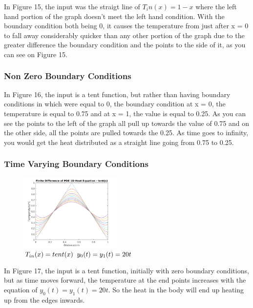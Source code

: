 \documentclass[11pt,a4paper]{article}
\begin{document}
In Figure 15, the input was the straigt line of $T_in(x) = 1-x$ where the left hand portion of the graph doesn't meet the left hand condition. With the boundary condition both being 0, it causes the temperature from just after x = 0 to fall away considerably quicker than any other portion of the graph due to the greater difference the boundary condition and the points to the side of it, as you can see on Figure 15.

\subsubsection{Non Zero Boundary Conditions}

In Figure 16, the input is a tent function, but rather than having boundary conditions in which were equal to 0, the boundary condition at x = 0, the temperature is equal to 0.75 and at x = 1, the value is equal to 0.25. As you can see the points to the left of the graph all pull up towards the value of 0.75 and on the other side, all the points are pulled towards the 0.25. As time goes to infinity, you would get the heat distributed as a straight line going from 0.75 to 0.25.

\pagebreak

\subsubsection{Time Varying Boundary Conditions}

\begin{figure}
	\vspace{-6mm}
	\includegraphics[width=0.45\textwidth]{Ex4_Figs/timevar.png}
	\vspace{-3mm}
	\caption{$T_{in}(x)= tent(x) \hspace{2mm} y_0(t) = y_1(t) = 20t$}
\end{figure}

In Figure 17, the input is a tent function, initially with zero boundary conditions, but as time moves forward, the temperature at the end points increases with the equation of $y_0(t) = y_1(t) = 20t$. So the heat in the body will end up heating up from the edges inwards.
\end{document}

